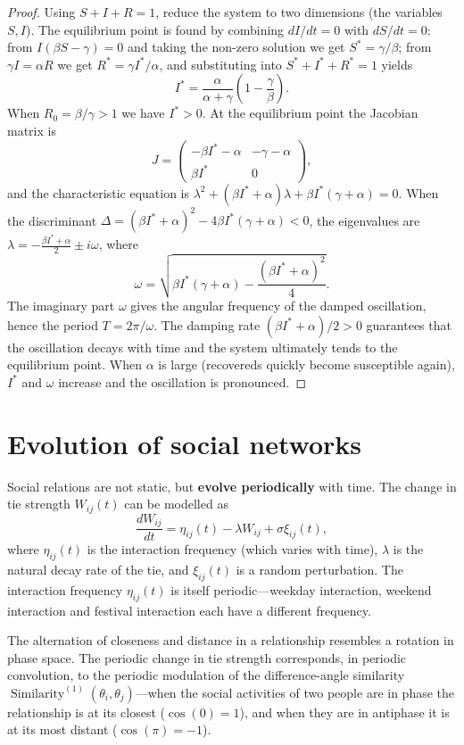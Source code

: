 \begin{proof}
Using $S+I+R=1$, reduce the system to two dimensions (the variables $S, I$). The equilibrium point is found by combining $dI/dt = 0$ with $dS/dt = 0$: from $I(\beta S-\gamma)=0$ and taking the non-zero solution we get $S^* = \gamma/\beta$; from $\gamma I = \alpha R$ we get $R^* = \gamma I^*/\alpha$, and substituting into $S^*+I^*+R^*=1$ yields
\[
I^* = \frac{\alpha}{\alpha+\gamma}\left(1-\frac{\gamma}{\beta}\right).
\]
When $R_0 = \beta/\gamma > 1$ we have $I^* > 0$. At the equilibrium point the Jacobian matrix is
\[
J = \begin{pmatrix} -\beta I^* - \alpha & -\gamma - \alpha \\ \beta I^* & 0 \end{pmatrix},
\]
and the characteristic equation is $\lambda^2 + (\beta I^*+\alpha)\lambda + \beta I^*(\gamma+\alpha) = 0$. When the discriminant $\Delta = (\beta I^*+\alpha)^2 - 4\beta I^*(\gamma+\alpha) < 0$, the eigenvalues are $\lambda = -\frac{\beta I^*+\alpha}{2} \pm i\omega$, where
\[
\omega = \sqrt{\beta I^*(\gamma+\alpha) - \frac{(\beta I^*+\alpha)^2}{4}}.
\]
The imaginary part $\omega$ gives the angular frequency of the damped oscillation, hence the period $T = 2\pi/\omega$. The damping rate $(\beta I^*+\alpha)/2 > 0$ guarantees that the oscillation decays with time and the system ultimately tends to the equilibrium point. When $\alpha$ is large (recovereds quickly become susceptible again), $I^*$ and $\omega$ increase and the oscillation is pronounced.
\end{proof}

\section{Evolution of social networks}

\begin{definition}\label{def:relationship_cycle}
Social relations are not static, but \textbf{evolve periodically} with time. The change in tie strength $W_{ij}(t)$ can be modelled as
\[
\frac{dW_{ij}}{dt} = \eta_{ij}(t) - \lambda W_{ij} + \sigma \xi_{ij}(t),
\]
where $\eta_{ij}(t)$ is the interaction frequency (which varies with time), $\lambda$ is the natural decay rate of the tie, and $\xi_{ij}(t)$ is a random perturbation. The interaction frequency $\eta_{ij}(t)$ is itself periodic---weekday interaction, weekend interaction and festival interaction each have a different frequency.

The alternation of closeness and distance in a relationship resembles a rotation in phase space. The periodic change in tie strength corresponds, in periodic convolution, to the periodic modulation of the difference-angle similarity $\operatorname{Similarity}^{(1)}(\theta_i, \theta_j)$---when the social activities of two people are in phase the relationship is at its closest ($\cos(0)=1$), and when they are in antiphase it is at its most distant ($\cos(\pi)=-1$).
\end{definition}

